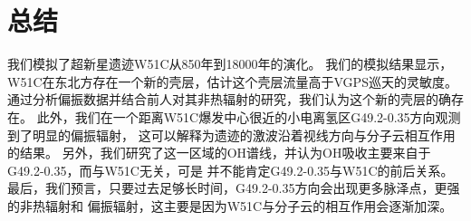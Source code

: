 \section{总结}
\label{W51Csum}
我们模拟了超新星遗迹W51C从850年到18000年的演化。
我们的模拟结果显示，W51C在东北方存在一个新的壳层，估计这个壳层流量高于VGPS巡天的灵敏度。
通过分析偏振数据并结合前人对其非热辐射的研究，我们认为这个新的壳层的确存在。
此外，我们在一个距离W51C爆发中心很近的小电离氢区G49.2-0.35方向观测到了明显的偏振辐射，
这可以解释为遗迹的激波沿着视线方向与分子云相互作用的结果。
另外，我们研究了这一区域的OH谱线，并认为OH吸收主要来自于G49.2-0.35，而与W51C无关，可是
并不能肯定G49.2-0.35与W51C的前后关系。
最后，我们预言，只要过去足够长时间，G49.2-0.35方向会出现更多脉泽点，更强的非热辐射和
偏振辐射，这主要是因为W51C与分子云的相互作用会逐渐加深。
